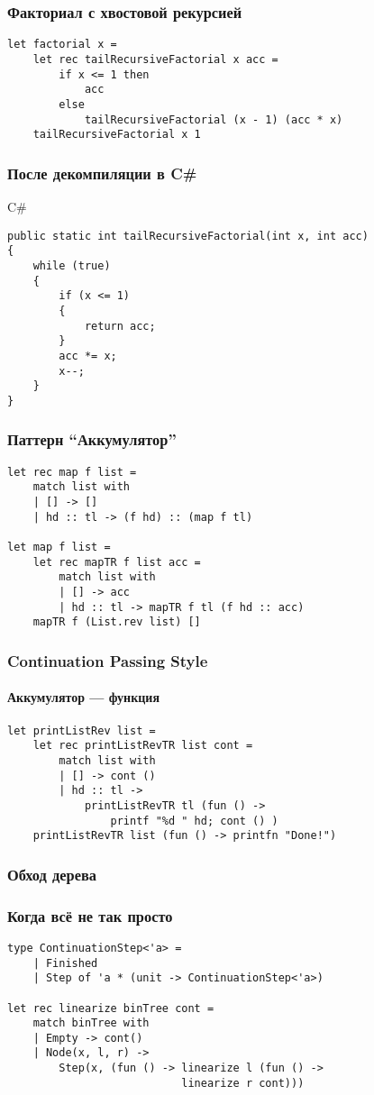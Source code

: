 \documentclass[xetex,mathserif,serif]{beamer}
\begin{document}
	\begin{frame}[fragile]
		\frametitle{Факториал с хвостовой рекурсией}
		\begin{verbatim}
let factorial x =
    let rec tailRecursiveFactorial x acc =
        if x <= 1 then
            acc
        else
            tailRecursiveFactorial (x - 1) (acc * x)
    tailRecursiveFactorial x 1
		\end{verbatim}
	\end{frame}
	
	\begin{frame}[fragile]
		\frametitle{После декомпиляции в C\#}
		\begin{alertblock}{C\#}
			\begin{verbatim}
public static int tailRecursiveFactorial(int x, int acc)
{
    while (true)
    {
        if (x <= 1)
        {
            return acc;
        }
        acc *= x;
        x--;
    }
}
			\end{verbatim}
		\end{alertblock}
	\end{frame}

	\begin{frame}[fragile]
		\frametitle{Паттерн ``Аккумулятор''}
		\begin{verbatim}
let rec map f list =
    match list with
    | [] -> []
    | hd :: tl -> (f hd) :: (map f tl)

let map f list =
    let rec mapTR f list acc =
        match list with
        | [] -> acc
        | hd :: tl -> mapTR f tl (f hd :: acc)
    mapTR f (List.rev list) []
		\end{verbatim}
	\end{frame}

	\begin{frame}[fragile]
		\frametitle{Continuation Passing Style}
		\framesubtitle{Аккумулятор --- функция}
		\begin{verbatim}
let printListRev list =
    let rec printListRevTR list cont =
        match list with
        | [] -> cont ()
        | hd :: tl ->
            printListRevTR tl (fun () -> 
                printf "%d " hd; cont () )
    printListRevTR list (fun () -> printfn "Done!")
		\end{verbatim}
	\end{frame}

	\begin{frame}[fragile]
		\frametitle{Обход дерева}
		\frametitle{Когда всё не так просто}
		\begin{verbatim}
type ContinuationStep<'a> =
    | Finished
    | Step of 'a * (unit -> ContinuationStep<'a>)

let rec linearize binTree cont =
    match binTree with
    | Empty -> cont()
    | Node(x, l, r) ->
        Step(x, (fun () -> linearize l (fun () -> 
                           linearize r cont)))
		\end{verbatim}
	\end{frame}
\end{document}
